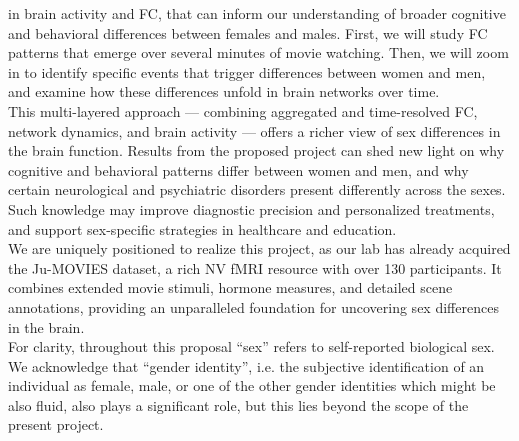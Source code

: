 \documentclass[11pt,a4paper]{article}
\begin{document}
in brain activity and FC, that can inform our understanding of 
broader cognitive and behavioral differences between females and males. 
First, we will study FC patterns that emerge over several minutes of movie watching. Then, we will zoom in to
identify specific events that trigger differences between women and men, and examine how these differences 
unfold in brain networks over time.\\
This multi-layered approach — combining aggregated and time-resolved FC, network dynamics, and brain activity — offers 
a richer view of sex differences in the brain function. 
Results from the proposed project can shed new light on why cognitive and behavioral patterns differ 
between women and men, and why certain neurological and psychiatric disorders present differently across the sexes. 
Such knowledge may improve diagnostic precision and personalized treatments, and support sex-specific 
strategies in healthcare and education.\\
We are uniquely positioned to realize this project, as our lab has already acquired the Ju-MOVIES dataset, 
a rich NV fMRI resource with over 130 participants. It combines extended movie stimuli, 
hormone measures, and detailed scene annotations, providing an unparalleled foundation for 
uncovering sex differences in the brain.\\
For clarity, throughout this proposal “sex” refers to self-reported biological sex. 
We acknowledge that “gender identity”, i.e. the 
subjective identification of an individual as female, male, or one of the other gender identities which might 
be also fluid, also plays a significant role, but this lies 
beyond the scope of the present project.
\end{document}
